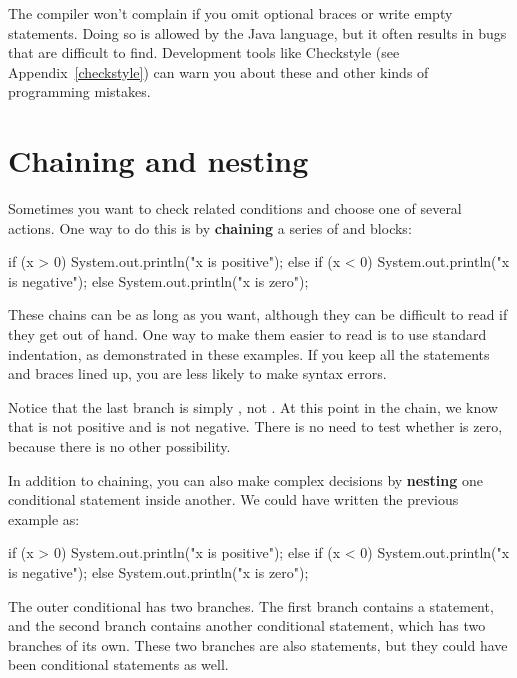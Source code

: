 The compiler won't complain if you omit optional braces or write empty statements.
Doing so is allowed by the Java language, but it often results in bugs that are difficult to find.
Development tools like Checkstyle (see Appendix~\ref{checkstyle}) can warn you about these and other kinds of programming mistakes.


\section{Chaining and nesting}


Sometimes you want to check related conditions and choose one of several actions.
One way to do this is by {\bf chaining} a series of  and  blocks:

\begin{code}
if (x > 0) {
    System.out.println("x is positive");
} else if (x < 0) {
    System.out.println("x is negative");
} else {
    System.out.println("x is zero");
}
\end{code}

These chains can be as long as you want, although they can be difficult to read if they get out of hand.
One way to make them easier to read is to use standard indentation, as demonstrated in these examples.
If you keep all the statements and braces lined up, you are less likely to make syntax errors.

Notice that the last branch is simply , not .
At this point in the chain, we know that  is not positive and  is not negative.
There is no need to test whether  is zero, because there is no other possibility.


In addition to chaining, you can also make complex decisions by {\bf nesting} one conditional statement inside another.
We could have written the previous example as:

\begin{code}
if (x > 0) {
    System.out.println("x is positive");
} else {
    if (x < 0) {
        System.out.println("x is negative");
    } else {
        System.out.println("x is zero");
    }
}
\end{code}

The outer conditional has two branches.
The first branch contains a  statement, and the second branch contains another conditional statement, which has two branches of its own.
These two branches are also  statements, but they could have been conditional statements as well.


